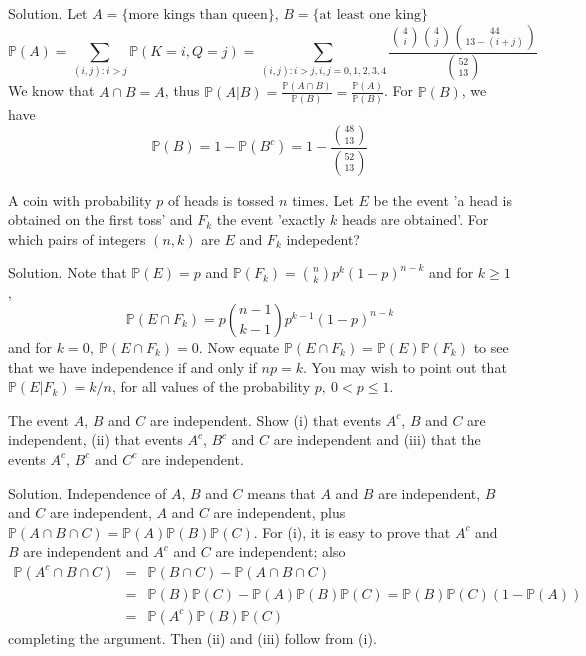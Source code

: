 Solution. Let $A=\{\text{more kings than queen}\}$, $B=\{\text{at least one king}\}$
\begin{equation}
\mathbb{P}(A)=\sum_{(i,j):i>j}\mathbb{P}(K=i,Q=j) = \sum_{(i,j):i>j, i,j=0,1,2,3,4}\frac{\binom{4}{i}\binom{4}{j}\binom{44}{13-(i+j)}}{\binom{52}{13}}
\end{equation}
We know that $A\cap B=A$, thus $\mathbb{P}(A|B)=\frac{\mathbb{P}(A\cap B)}{\mathbb{P}(B)} = \frac{\mathbb{P}(A)}{\mathbb{P}(B)}$. For $\mathbb{P}(B)$, we have 
\begin{equation}
\mathbb{P}(B)=1-\mathbb{P}(B^c) = 1- \frac{\binom{48}{13}}{\binom{52}{13}}
\end{equation}


\item A coin with probability $p$ of heads is tossed $n$ times. Let $E$ be the event 'a head is obtained on the first toss' and $F_k$ the event 'exactly $k$ heads are obtained'. For which pairs of integers $(n,k)$ are $E$ and $F_k$ indepedent?



Solution. Note that $\mathbb{P}(E)=p$ and $\mathbb{P}(F_k)=\binom{n}{k}p^k(1-p)^{n-k}$ and for $k\geq 1$, 
\begin{equation}
\mathbb{P}(E\cap F_k)=p\binom{n-1}{k-1}p^{k-1}(1-p)^{n-k}
\end{equation}
and for $k=0,\ \mathbb{P}(E\cap F_k)=0$. Now equate $\mathbb{P}(E\cap F_k) = \mathbb{P}(E)\mathbb{P}(F_k)$ to see that we have independence if and only if $np=k$. You may wish to point out that $\mathbb{P}(E|F_k)=k/n$, for all values of the probability $p,\ 0<p\leq 1$. 


\item The event $A$, $B$ and $C$ are independent. Show (i) that events $A^c$, $B$ and $C$ are independent, (ii) that events $A^c$, $B^c$ and $C$ are independent and (iii) that the events $A^c$, $B^c$ and $C^c$ are independent.



Solution. Independence of $A$, $B$ and $C$ means that $A$ and $B$ are independent, $B$ and $C$ are independent, $A$ and $C$ are independent, plus $\mathbb{P}(A\cap B\cap C)= \mathbb{P}(A)\mathbb{P}(B)\mathbb{P}(C)$. For (i), it is easy to prove that $A^c$ and $B$ are independent and $A^c$ and $C$ are independent; also 
\begin{eqnarray}
\mathbb{P}(A^c\cap B\cap C) & = & \mathbb{P}(B\cap C) - \mathbb{P}(A\cap B\cap C) \nonumber\\
 & = & \mathbb{P}(B)\mathbb{P}(C) - \mathbb{P}(A)\mathbb{P}(B)\mathbb{P}(C) = \mathbb{P}(B)\mathbb{P}(C)(1-\mathbb{P}(A)) \nonumber\\
 & = & \mathbb{P}(A^c)\mathbb{P}(B)\mathbb{P}(C)
\end{eqnarray}
completing the argument. Then (ii) and (iii) follow from (i).


